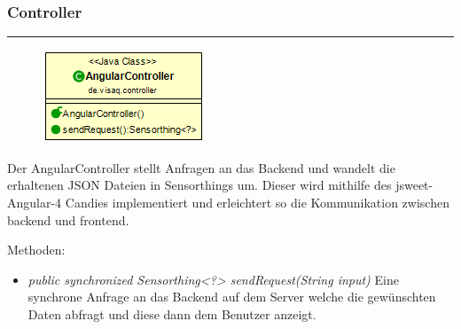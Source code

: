 \subsubsection{Controller}

\rule{\textwidth}{0.4pt}
\begin{minipage}{0.4\textwidth}
    \begin{figure}[H]
        {\centering\includegraphics[scale = 0.7]{media/frontend/controller/AngularController_Class.png}}
    \end{figure}
    \end{minipage} \hfill
    \begin{minipage}{0.6\textwidth}
Der AngularController stellt Anfragen an das Backend und wandelt die erhaltenen JSON Dateien in Sensorthings um. Dieser wird mithilfe des jsweet-Angular-4 Candies implementiert und erleichtert so die Kommunikation zwischen backend und frontend.
\end{minipage}
Methoden: \begin{itemize}
    \item \emph{public synchronized Sensorthing<?> sendRequest(String input)} Eine synchrone Anfrage an das Backend auf dem Server welche die gewünschten Daten abfragt und diese dann dem Benutzer anzeigt.
\end{itemize}